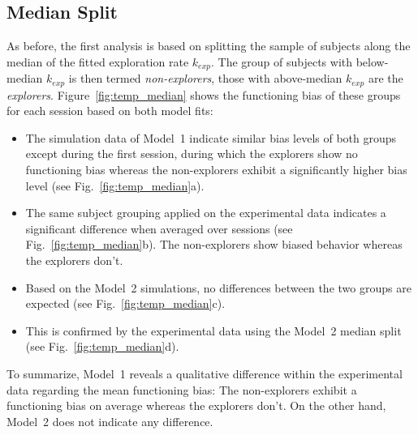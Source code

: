 \documentclass[a4paper]{scrreprt}
\begin{document}
\subsection{Median Split}
\label{sec:exploration_rate_median_split}

As before, the first analysis is based on splitting the sample of subjects along the median of the fitted exploration rate $k_{exp}$. The group of subjects with below-median $k_{exp}$ is then termed \textit{non-explorers}, those with above-median $k_{exp}$ are the \textit{explorers}. Figure~\ref{fig:temp_median} shows the functioning bias of these groups for each session based on both model fits:
\begin{itemize}
\item The simulation data of Model~1 indicate similar bias levels of both groups except during the first session, during which the explorers show no functioning bias whereas the non-explorers exhibit a significantly higher bias level (see Fig.~\ref{fig:temp_median}a).
\item The same subject grouping applied on the experimental data indicates a significant difference when averaged over sessions (see Fig.~\ref{fig:temp_median}b). The non-explorers show biased behavior whereas the explorers don't.
\item Based on the Model~2 simulations, no differences between the two groups are expected (see Fig.~\ref{fig:temp_median}c).
\item This is confirmed by the experimental data using the Model~2 median split (see Fig.~\ref{fig:temp_median}d).
\end{itemize}
To summarize, Model~1 reveals a qualitative difference within the experimental data regarding the mean functioning bias: The non-explorers exhibit a functioning bias on average whereas the explorers don't. On the other hand, Model~2 does not indicate any difference.
\end{document}
